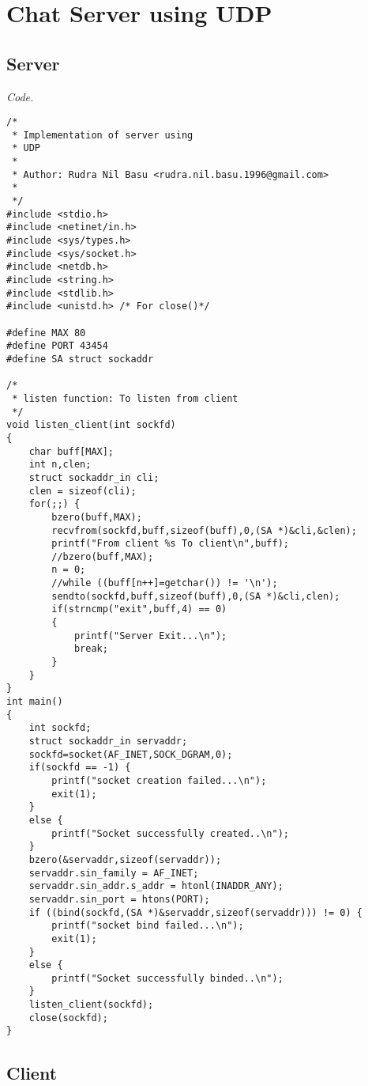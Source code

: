 \documentclass[12pt]{article}
\begin{document}
\section{Chat Server using UDP}

\subsection{Server}

\textit{Code.}

\begin{lstlisting}
/*
 * Implementation of server using
 * UDP
 * 
 * Author: Rudra Nil Basu <rudra.nil.basu.1996@gmail.com>
 * 
 */
#include <stdio.h>
#include <netinet/in.h>
#include <sys/types.h>
#include <sys/socket.h>
#include <netdb.h>
#include <string.h>
#include <stdlib.h>
#include <unistd.h> /* For close()*/

#define MAX 80
#define PORT 43454
#define SA struct sockaddr

/*
 * listen function: To listen from client
 */
void listen_client(int sockfd)
{
	char buff[MAX];
	int n,clen;
	struct sockaddr_in cli;
	clen = sizeof(cli);
	for(;;) {
		bzero(buff,MAX);
		recvfrom(sockfd,buff,sizeof(buff),0,(SA *)&cli,&clen);
		printf("From client %s To client\n",buff);
		//bzero(buff,MAX);
		n = 0;
		//while ((buff[n++]=getchar()) != '\n');
		sendto(sockfd,buff,sizeof(buff),0,(SA *)&cli,clen);
		if(strncmp("exit",buff,4) == 0)
		{
			printf("Server Exit...\n");
			break;
		}
	}
}
int main()
{
	int sockfd;
	struct sockaddr_in servaddr;
	sockfd=socket(AF_INET,SOCK_DGRAM,0);
	if(sockfd == -1) {
		printf("socket creation failed...\n");
		exit(1);
	}
	else {
		printf("Socket successfully created..\n");
	}
	bzero(&servaddr,sizeof(servaddr));
	servaddr.sin_family = AF_INET;
	servaddr.sin_addr.s_addr = htonl(INADDR_ANY);
	servaddr.sin_port = htons(PORT);
	if ((bind(sockfd,(SA *)&servaddr,sizeof(servaddr))) != 0) {
		printf("socket bind failed...\n");
		exit(1);
	}
	else {
		printf("Socket successfully binded..\n");
	}
	listen_client(sockfd);
	close(sockfd);
}

\end{lstlisting}

\subsection{Client}
\end{document}
